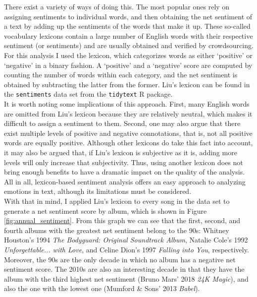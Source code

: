 \documentclass{article}
\begin{document}

There exist a variety of ways of doing this. The most popular ones rely on assigning sentiments to individual words, and then obtaining the net sentiment of a text by adding up the sentiments of the words that make it up. These so-called vocabulary lexicons contain a large number of English words with their respective sentiment (or sentiments) and are usually obtained and verified by crowdsourcing. \\




For this analysis I used the \cite{Liu_sentiments} lexicon, which categorizes words as either `positive' or `negative' in a binary fashion. A `positive' and a `negative' score are computed by counting the number of words within each category, and the net sentiment is obtained by subtracting the latter from the former. Liu's lexicon can be found in the \texttt{sentiments} data set from the \texttt{tidytext} \textsf{R} package. \\


It is worth noting some implications of this approach. First, many English words are omitted from Liu's lexicon because they are relatively neutral, which makes it difficult to assign a sentiment to them. Second, one may also argue that there exist multiple levels of positive and negative connotations, that is, not all positive words are equally positive. Although other lexicons do take this fact into account, it may also be argued that, if Liu's lexicon is subjective as it is, adding more levels will only increase that subjectivity. Thus, using another lexicon does not bring enough benefits to have a dramatic impact on the quality of the analysis. All in all, lexicon-based sentiment analysis offers an easy approach to analyzing emotions in text, although its limitations must be considered. \\



With that in mind, I applied Liu's lexicon to every song in the data set to generate a net sentiment score by album, which is shown in Figure \ref{fig:annual_sentiment}. From this graph we can see that the first, second, and fourth albums with the greatest net sentiment belong to the 90s: Whitney Houston's 1994 \textit{The Bodyguard: Original Soundtrack Album}, Natalie Cole's 1992 \textit{Unforgettable... with Love}, and Celine Dion's 1997 \textit{Falling into You}, respectively. Moreover, the 90s are the only decade in which no album has a negative net sentiment score. The 2010s are also an interesting decade in that they have the album with the third highest net sentiment (Bruno Mars' 2018 \textit{24K Magic}), and also the one with the lowest one (Mumford \& Sons' 2013 \textit{Babel}).
\end{document}
